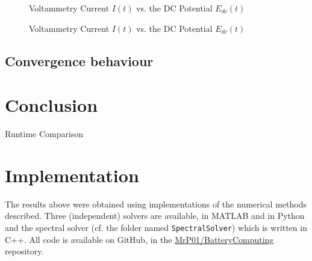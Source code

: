 \documentclass{prettytex/ox/mmsc-special-topic}
\begin{document}
  \begin{figure}[H]
    \centering
    \caption{Voltammetry Current $I(t)$ vs. the DC Potential $E_{dc}(t)$}
    \label{fig:different-E0s}
  \end{figure}

  \begin{figure}[H]
    \centering
    \caption{Voltammetry Current $I(t)$ vs. the DC Potential $E_{dc}(t)$}
    \label{fig:voltammetry-current}
  \end{figure}

  \subsection{Convergence behaviour}

  \section{Conclusion}

  \begin{table}[H]
    \caption{Runtime Comparison}
  \end{table}

  \pagebreak
  \printbibliography
  \printnoidxglossary[type=acronym]

  \appendix
  \section{Implementation}
  The results above were obtained using implementations of the numerical methods described.
  Three (independent) solvers are available, in MATLAB and in Python and the spectral solver (cf. the folder named \texttt{SpectralSolver}) which is written in C++.
  All code is available on GitHub, in the \href{https://github.com/MrP01/BatteryComputing}{MrP01/BatteryComputing} repository.
\end{document}
